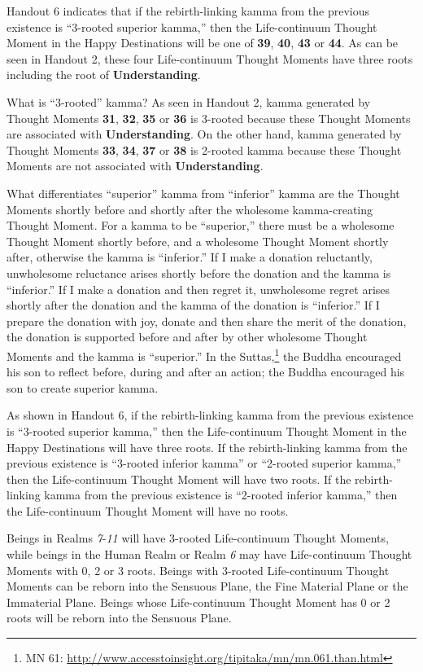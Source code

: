 Handout 6 indicates that if the rebirth-linking kamma from the previous existence is “3-rooted superior kamma,” then the Life-continuum Thought Moment in the Happy Destinations will be one of \textbf{39}, \textbf{40}, \textbf{43} or \textbf{44}. As can be seen in Handout 2, these four Life-continuum Thought Moments have three roots including the root of \textbf{Understanding}.

What is “3-rooted” kamma? As seen in Handout 2, kamma generated by Thought Moments \textbf{31}, \textbf{32}, \textbf{35} or \textbf{36} is 3-rooted because these Thought Moments are associated with \textbf{Understanding}. On the other hand, kamma generated by Thought Moments \textbf{33}, \textbf{34}, \textbf{37} or \textbf{38} is 2-rooted kamma because these Thought Moments are not associated with \textbf{Understanding}.

What differentiates “superior” kamma from “inferior” kamma are the Thought Moments shortly before and shortly after the wholesome kamma-creating Thought Moment. For a kamma to be “superior,” there must be a wholesome Thought Moment shortly before, and a wholesome Thought Moment shortly after, otherwise the kamma is “inferior.” If I make a donation reluctantly, unwholesome reluctance arises shortly before the donation and the kamma is “inferior.” If I make a donation and then regret it, unwholesome regret arises shortly after the donation and the kamma of the donation is “inferior.” If I prepare the donation with joy, donate and then share the merit of the donation, the donation is supported before and after by other wholesome Thought Moments and the kamma is “superior.” In the Suttas,\footnote{MN 61: \url{http://www.accesstoinsight.org/tipitaka/mn/mn.061.than.html}} the Buddha encouraged his son to reflect before, during and after an action; the Buddha encouraged his son to create superior kamma.

As shown in Handout 6, if the rebirth-linking kamma from the previous existence is “3-rooted superior kamma,” then the Life-continuum Thought Moment in the Happy Destinations will have three roots. If the rebirth-linking kamma from the previous existence is “3-rooted inferior kamma” or “2-rooted superior kamma,” then the Life-continuum Thought Moment will have two roots. If the rebirth-linking kamma from the previous existence is “2-rooted inferior kamma,” then the Life-continuum Thought Moment will have no roots.

Beings in Realms \textit{7}-\textit{11} will have 3-rooted Life-continuum Thought Moments, while beings in the Human Realm or Realm \textit{6} may have Life-continuum Thought Moments with 0, 2 or 3 roots. Beings with 3-rooted Life-continuum Thought Moments can be reborn into the Sensuous Plane, the Fine Material Plane or the Immaterial Plane. Beings whose Life-continuum Thought Moment has 0 or 2 roots will be reborn into the Sensuous Plane.

